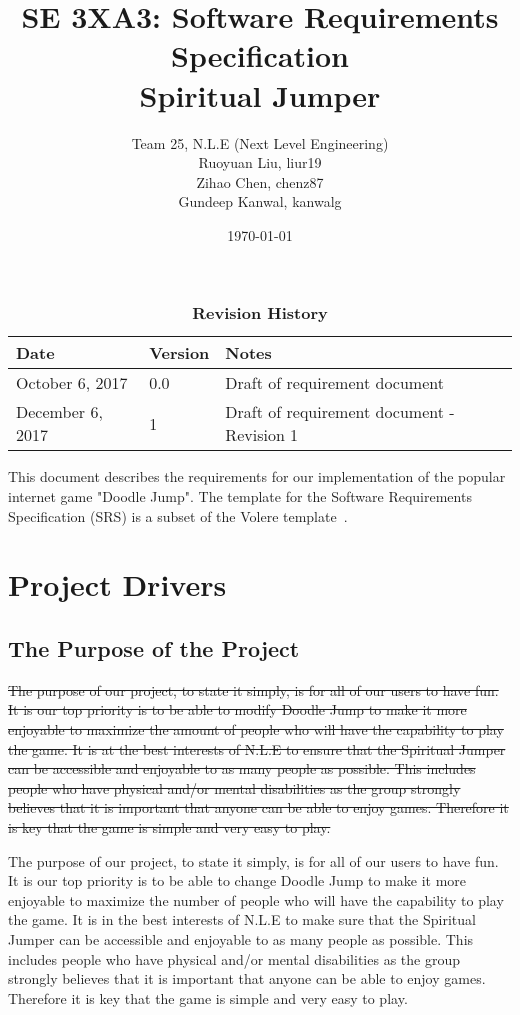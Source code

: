 \documentclass[12pt, titlepage]{article}
\title{SE 3XA3: Software Requirements Specification\\Spiritual Jumper}
\author{Team 25, N.L.E (Next Level Engineering)
		\\ Ruoyuan Liu, liur19
		\\ Zihao Chen, chenz87
		\\ Gundeep Kanwal, kanwalg
}
\date{\today}
\newcommand{\rev}[1]{\textcolor{RevisionColour}{#1}}
\begin{document}
\maketitle

\tableofcontents
\listoftables
\listoffigures

\begin{table}[bp]
\caption{\bf Revision History}
\begin{tabularx}{\textwidth}{p{3cm}p{2cm}X}
\toprule {\bf Date} & {\bf Version} & {\bf Notes}\\
\midrule
October 6, 2017 & 0.0 & Draft of requirement document\\
\rev{December 6, 2017} & \rev{1} & \rev{Draft of requirement document - Revision 1}\\
\bottomrule
\end{tabularx}
\end{table}

\newpage


This document describes the requirements for our implementation of the popular internet game "Doodle Jump". The template for the Software
Requirements Specification (SRS) is a subset of the Volere
template~\citep{RobertsonAndRobertson2012}.

\section{Project Drivers}

\subsection{The Purpose of the Project}

\sout{The purpose of our project, to state it simply, is for all of our users to have fun. It is our top priority is to be able to modify Doodle Jump to make it more enjoyable to maximize the amount of people who will have the capability to play the game. It is at the best interests of N.L.E to ensure that the Spiritual Jumper can be accessible and enjoyable to as many people as possible. This includes people who have physical and/or mental disabilities as the group strongly believes that it is important that anyone can be able to enjoy games. Therefore it is key that the game is simple and very easy to play.}

\rev{The purpose of our project, to state it simply, is for all of our users to have fun. It is our top priority is to be able to change Doodle Jump to make it more enjoyable to maximize the number of people who will have the capability to play the game. It is in the best interests of N.L.E to make sure that the Spiritual Jumper can be accessible and enjoyable to as many people as possible. This includes people who have physical and/or mental disabilities as the group strongly believes that it is important that anyone can be able to enjoy games. Therefore it is key that the game is simple and very easy to play.}
\end{document}
